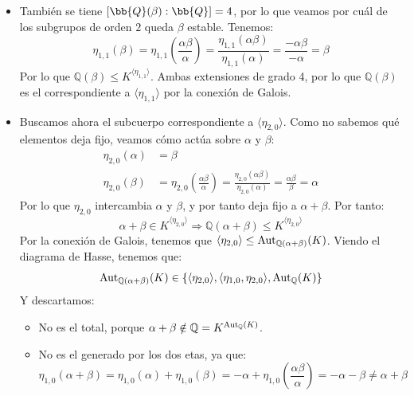 \begin{ejemplo}
\begin{itemize}
        \item También se tiene $[\bb{Q}(\beta):\bb{Q}] = 4$, por lo que veamos por cuál de los subgrupos de orden $2$ queda $\beta$ estable. Tenemos:
            \begin{equation*}
                \eta_{1,1}(\beta) = \eta_{1,1}\left(\frac{\alpha\beta}{\alpha}\right) = \frac{\eta_{1,1}(\alpha\beta)}{\eta_{1,1}(\alpha)} = \frac{-\alpha\beta}{-\alpha} = \beta
            \end{equation*}
            Por lo que $\mathbb{Q}(\beta) \leq K^{\langle \eta_{1,1} \rangle }$. Ambas extensiones de grado 4, por lo que $\mathbb{Q}(\beta)$ es el correspondiente a $\langle \eta_{1,1} \rangle $ por la conexión de Galois.
        \item Buscamos ahora el subcuerpo correspondiente a $\langle \eta_{2,0} \rangle $. Como no sabemos qué elementos deja fijo, veamos cómo actúa sobre $\alpha$ y $\beta$:
        \begin{align*}
            \eta_{2,0}(\alpha) &= \beta\\
            \eta_{2,0}(\beta) &= \eta_{2,0}\left(\frac{\alpha\beta}{\alpha}\right) = \frac{\eta_{2,0}(\alpha\beta)}{\eta_{2,0}(\alpha)} = \frac{\alpha\beta}{\beta} = \alpha
        \end{align*}
        Por lo que $\eta_{2,0}$ intercambia $\alpha$ y $\beta$, y por tanto deja fijo a $\alpha+\beta$. Por tanto:
            \begin{equation*}
                \alpha + \beta \in K^{\langle \eta_{2,0} \rangle } \Longrightarrow \mathbb{Q}(\alpha+\beta)\leq K^{\langle \eta_{2,0} \rangle }
            \end{equation*}
            Por la conexión de Galois, tenemos que $\langle \eta_{2,0} \rangle  \leq \operatorname{Aut}_{\mathbb{Q}(\alpha+\beta)}(K)$. Viendo el diagrama de Hasse, tenemos que:
            \begin{equation*}
                \operatorname{Aut}_{\mathbb{Q}(\alpha+\beta)}(K) \in \{\langle \eta_{2,0} \rangle, \langle \eta_{1,0},\eta_{2,0} \rangle, \operatorname{Aut}_\mathbb{Q}(K)  \}
            \end{equation*}
            Y descartamos:
            \begin{itemize}
                \item No es el total, porque $\alpha+\beta\notin \mathbb{Q} = K^{\operatorname{Aut}_\mathbb{Q}(K)}$.
                \item No es el generado por los dos etas, ya que:
                    \begin{equation*}
                        \eta_{1,0}(\alpha+\beta) = \eta_{1,0}(\alpha) + \eta_{1,0}(\beta) = -\alpha + \eta_{1,0}\left(\frac{\alpha\beta}{\alpha}\right) = -\alpha-\beta \neq \alpha + \beta

\end{equation*}
\end{itemize}
\end{itemize}
\end{ejemplo}
